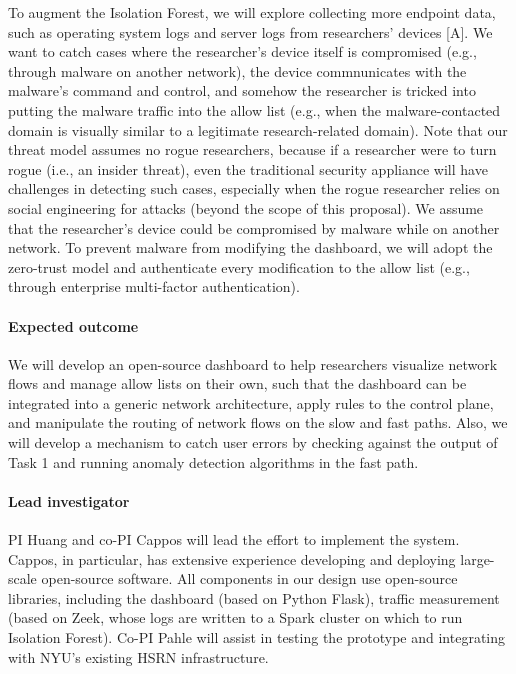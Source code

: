 To augment the Isolation Forest, we will explore collecting more endpoint data, such as operating system logs and server logs from researchers' devices [A]. We want to catch cases where the researcher's device itself is compromised (e.g., through malware on another network), the device commnunicates with the malware's command and control, and somehow the researcher is tricked into putting the malware traffic into the allow list (e.g., when the malware-contacted domain is visually similar to a legitimate research-related domain). Note that our threat model assumes no rogue researchers, because if a researcher were to turn rogue (i.e., an insider threat), even the traditional security appliance will have challenges in detecting such cases, especially when the rogue researcher relies on social engineering for attacks (beyond the scope of this proposal). We assume that the researcher's device could be compromised by malware while on another network. To prevent malware from modifying the dashboard, we will adopt the zero-trust model and authenticate every modification to the allow list (e.g., through enterprise multi-factor authentication).
















\paragraph{Expected outcome} We will develop an open-source dashboard to help researchers visualize network flows and manage allow lists on their own, such that the dashboard can be integrated into a generic network architecture, apply rules to the control plane, and manipulate the routing of network flows on the slow and fast paths. Also, we will develop a mechanism to catch user errors by checking against the output of Task 1 and running anomaly detection algorithms in the fast path.


\paragraph{Lead investigator} PI Huang and co-PI Cappos will lead the effort to implement the system. Cappos, in particular, has extensive experience developing and deploying large-scale open-source software. All components in our design use open-source libraries, including the dashboard (based on Python Flask), traffic measurement (based on Zeek, whose logs are written to a Spark cluster on which to run Isolation Forest). Co-PI Pahle will assist in testing the prototype and integrating with NYU's existing HSRN infrastructure.
